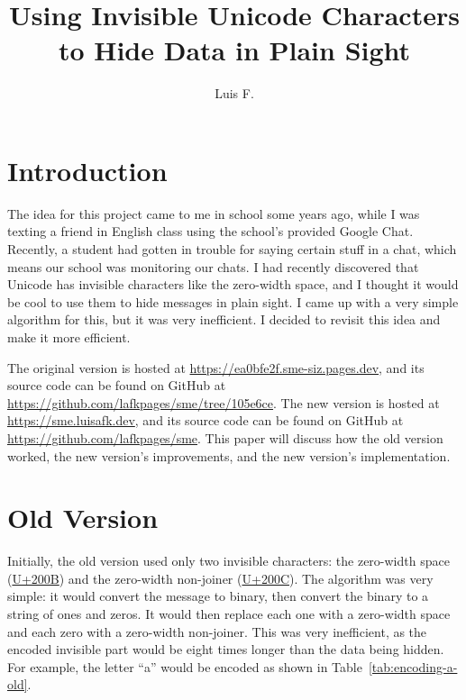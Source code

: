 \documentclass{article}
\title{Using Invisible Unicode Characters to Hide Data in Plain Sight}
\author{Luis F.}
\newcommand{\U}[1]{U+#1}
\begin{document}
\maketitle

\section{Introduction}

The idea for this project came to me in school some years ago, while I was texting a friend in English class using the school's provided Google Chat. Recently, a student had gotten in trouble for saying certain stuff in a chat, which means our school was monitoring our chats. I had recently discovered that Unicode has invisible characters like the zero-width space, and I thought it would be cool to use them to hide messages in plain sight. I came up with a very simple algorithm for this, but it was very inefficient. I decided to revisit this idea and make it more efficient.

The original version is hosted at \url{https://ea0bfe2f.sme-siz.pages.dev}, and its source code can be found on GitHub at \url{https://github.com/lafkpages/sme/tree/105e6ce}. The new version is hosted at \url{https://sme.luisafk.dev}, and its source code can be found on GitHub at \url{https://github.com/lafkpages/sme}. This paper will discuss how the old version worked, the new version's improvements, and the new version's implementation.

\section{Old Version}

Initially, the old version used only two invisible characters: the zero-width space (\href{https://compart.com/en/unicode/U+200B}{\U{200B}}) and the zero-width non-joiner (\href{https://compart.com/en/unicode/U+200C}{\U{200C}}). The algorithm was very simple: it would convert the message to binary, then convert the binary to a string of ones and zeros. It would then replace each one with a zero-width space and each zero with a zero-width non-joiner. This was very inefficient, as the encoded invisible part would be eight times longer than the data being hidden. For example, the letter ``a'' would be encoded as shown in Table~\ref{tab:encoding-a-old}.
\end{document}
